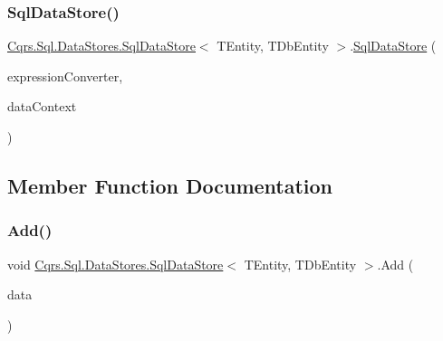 \subsubsection{\texorpdfstring{Sql\+Data\+Store()}{SqlDataStore()}}
{\footnotesize\ttfamily \hyperlink{classCqrs_1_1Sql_1_1DataStores_1_1SqlDataStore}{Cqrs.\+Sql.\+Data\+Stores.\+Sql\+Data\+Store}$<$ T\+Entity, T\+Db\+Entity $>$.\hyperlink{classCqrs_1_1Sql_1_1DataStores_1_1SqlDataStore}{Sql\+Data\+Store} (\begin{DoxyParamCaption}\item[{\hyperlink{interfaceCqrs_1_1Sql_1_1DataStores_1_1IExpressionTreeConverter}{I\+Expression\+Tree\+Converter}}]{expression\+Converter,  }\item[{Data\+Context}]{data\+Context }\end{DoxyParamCaption})}



\subsection{Member Function Documentation}
\mbox{\label{classCqrs_1_1Sql_1_1DataStores_1_1SqlDataStore_a715ab041546e864cb9551d165c240f33}} 
\subsubsection{\texorpdfstring{Add()}{Add()}\hspace{0.1cm}{\footnotesize\ttfamily [1/2]}}
{\footnotesize\ttfamily void \hyperlink{classCqrs_1_1Sql_1_1DataStores_1_1SqlDataStore}{Cqrs.\+Sql.\+Data\+Stores.\+Sql\+Data\+Store}$<$ T\+Entity, T\+Db\+Entity $>$.Add (\begin{DoxyParamCaption}\item[{T\+Entity}]{data }\end{DoxyParamCaption})}

\mbox{\label{classCqrs_1_1Sql_1_1DataStores_1_1SqlDataStore_a510fc3eafe64f999b99290cd8924a00e}} 
